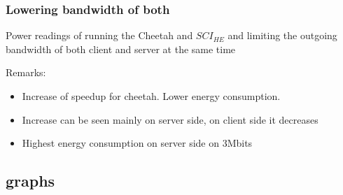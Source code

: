 \documentclass[../thesis.tex]{subfiles}
\begin{document}
\newpage
\subsubsection{Lowering bandwidth of both}

\begin{table}[ht]
        \begin{adjustbox}{width=\columnwidth,center}
                
        \end{adjustbox}
        \caption{Power readings of running the Cheetah and $SCI_{HE}$ and limiting the outgoing bandwidth of both client and server at the same time}
        \label{table:powerreadingsboth}
\end{table}
Remarks:
\begin{itemize}
    \item Increase of speedup for cheetah. Lower energy consumption. 
    \item Increase can be seen mainly on server side, on client side it decreases
    \item Highest energy consumption on server side on 3Mbits
\end{itemize}

\subsection{graphs}

    
\end{document}

